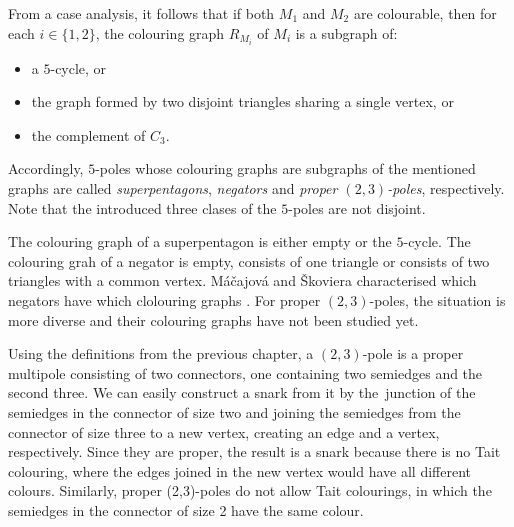 From a case analysis, it follows that if both $M_1$ and $M_2$ are colourable, then for each $i \in \{1, 2\}$, the colouring graph $R_{M_i}$ of $M_i$ is a subgraph of:
\begin{itemize}
\item a $5$-cycle, or
\item the graph formed by two disjoint triangles sharing a single vertex, or
\item the complement of $C_3$.
\end{itemize}
Accordingly, $5$-poles whose colouring graphs are subgraphs of the mentioned graphs are called \textit{superpentagons}, \textit{negators} and \textit{proper $(2 ,3)$-poles}, respectively. Note that the introduced three clases of the $5$-poles are not disjoint.

The colouring graph of a superpentagon is either empty or the $5$-cycle. The colouring grah of a negator is empty, consists of one triangle or consists of two triangles with a common vertex.
Máčajová and Škoviera characterised which negators have which clolouring graphs \cite{IrreducibleSnarksSkoviera}.
For proper $(2,3)$-poles, the situation is more diverse and their colouring graphs have not been studied yet.




Using the definitions from the previous chapter, a $(2,3)$-pole is a proper multipole consisting of two connectors, one containing two semiedges and the second three. We can easily construct a snark from it by the~junction of the semiedges in the connector of size two and joining the semiedges from the connector of size three to a new vertex, creating an edge and a vertex, respectively. Since they are proper, the result is a snark because there is no Tait colouring, where the edges joined in the new vertex would have all different colours. Similarly, proper (2,3)-poles do not allow Tait colourings, in which the semiedges in the connector of size 2 have the same colour.

